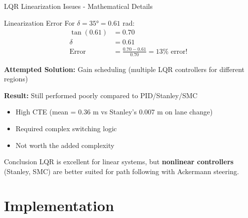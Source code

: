 \documentclass[10pt]{beamer}
\begin{document}
\begin{frame}{LQR Linearization Issues - Mathematical Details}
  \begin{block}{Linearization Error}
    For $\delta = 35° = 0.61$ rad:
    \begin{align*}
      \tan(0.61) &= 0.70 \\
      \delta &= 0.61 \\
      \text{Error} &= \frac{0.70 - 0.61}{0.70} = 13\% \text{ error!}
    \end{align*}
  \end{block}

  \textbf{Attempted Solution:} Gain scheduling (multiple LQR controllers for different regions)

  \textbf{Result:} Still performed poorly compared to PID/Stanley/SMC
  \begin{itemize}
    \item High CTE (mean = 0.36 m vs Stanley's 0.007 m on lane change)
    \item Required complex switching logic
    \item Not worth the added complexity
  \end{itemize}

  \vspace{0.3cm}

  \begin{block}{Conclusion}
    LQR is excellent for linear systems, but \textbf{nonlinear controllers} (Stanley, SMC) are better suited for path following with Ackermann steering.
  \end{block}
\end{frame}

\section{Implementation}
\end{document}

